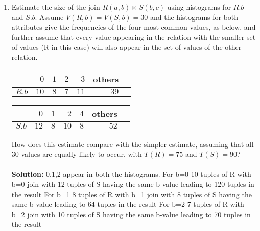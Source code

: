 


\newcommand{\subtitle}{\textbf{Exercise 5}}
\newcommand{\outdate}{20.11.2023}
\newcommand{\duedate}{27.11.2023 12:00 MEZ}
\newcommand{\video}{027}






\begin{enumerate}

  \item Estimate the size of the join $R(a,b) \Join S(b,c)$ using histograms for $R.b$ and $S.b$. Assume $V(R,b) = V(S,b) = 30$ and the histograms
        for both attributes give the frequencies of the four most common values, as below, and further assume that every value appearing in the relation with the smaller set of values (R in this case) will also appear in the set of values of the other relation.

        \begin{minipage}{.49\textwidth}
          \begin{center}
            \begin{tabular}{|c|r|r|r|r|r|r}
                    & $0$   & $1$ & $2$ & $3$  & others \\\hline
              $R.b$ & $10 $ & $8$ & $7$ & $11$ & $39$   \\

            \end{tabular}
          \end{center}
        \end{minipage}
        \begin{minipage}{.49\textwidth}
          \begin{center}
            \begin{tabular}{|c|r|r|r|r|r|r}
                    & $0$   & $1$ & $2$  & $4$ & others \\\hline
              $S.b$ & $12 $ & $8$ & $10$ & $8$ & $52$   \\

            \end{tabular}
          \end{center}
        \end{minipage}

        How does this estimate compare with the simpler estimate, assuming that all $30$ values are equally likely to occur, with $T(R)=75$ and $T(S)=90$?\\\\
  {\bf Solution:}
  0,1,2 appear in both the histograms.
  For b=0 
    10 tuples of R with b=0 join with 12 tuples of S having the same b-value leading to 120 tuples in the result
  For b=1
    8 tuples of R with b=1 join with 8 tuples of S having the same b-value leading to 64 tuples in the result
  For b=2
    7 tuples of R with b=2 join with 10 tuples of S having the same b-value leading to 70 tuples in the result
  

\end{enumerate}
